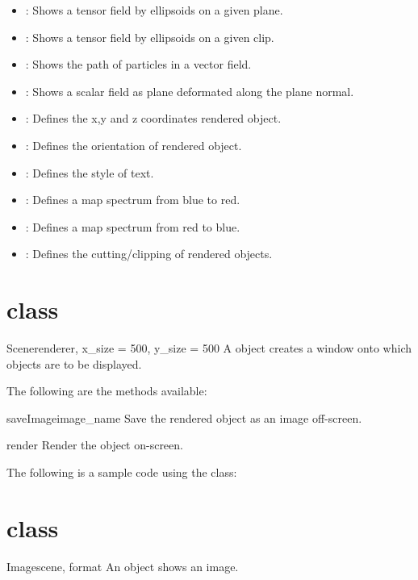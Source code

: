 \begin{itemize}
\item \TensorOnPlane: Shows a tensor field by ellipsoids on 
a given plane.
\item \TensorOnClip: Shows a tensor field by ellipsoids on a given clip.
\item \StreamLines: Shows the path of particles in a vector field.
\item \Carpet: Shows a scalar field as plane deformated along 
the plane normal.
\item \Position: Defines the x,y and z coordinates rendered object.
\item \Transform: Defines the orientation of rendered object.
\item \Style: Defines the style of text.
\item \BlueToRed: Defines a map spectrum from blue to red.
\item \RedToBlue: Defines a map spectrum from red to blue.
\item \Plane: Defines the cutting/clipping of rendered objects.
\end{itemize}

\section{\Scene class}
\begin{classdesc}{Scene}{renderer, x_size = 500, y_size = 500}
A \Scene object creates a window onto which objects are to be displayed. 
\end{classdesc}

The following are the methods available:
\begin{methoddesc}[Scene]{saveImage}{image_name}
Save the rendered object as an image off-screen. 
\end{methoddesc}

\begin{methoddesc}[Scene]{render}{}
Render the object on-screen.
\end{methoddesc}

The following is a sample code using the \Scene class:


\section{\Image class}
\begin{classdesc}{Image}{scene, format}
An \Image object shows an image.
\end{classdesc}


